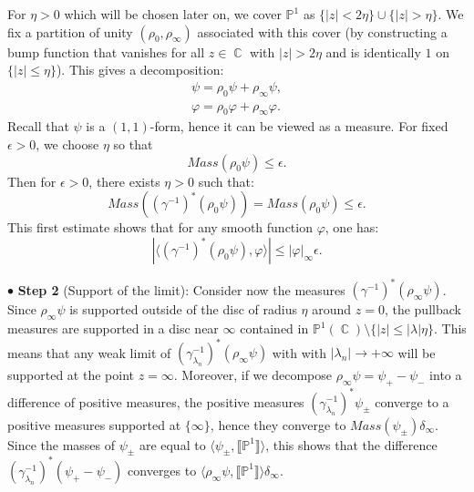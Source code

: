 \documentclass[12pt]{amsbook}%
\theoremstyle{definition}
\theoremstyle{remark}
\numberwithin{section}{chapter}
\numberwithin{subsection}{section}
\numberwithin{figure}{chapter}
\DeclareMathOperator{\C}{\mathbb{C}}
\newcommand\intcur[1]{\llbracket #1 \rrbracket}
\def\bP{{\mathbb{P}}}
\def\la{\lambda}
\begin{document}
{{For $\eta>0$ which will be chosen later on,
we cover $\bP^1$ as $\{ |z| < 2 \eta \} \cup \{ |z| > \eta \}$. We fix a partition of unity $(\rho_0, \rho_\infty)$ associated with this 
cover (by constructing a bump function that vanishes for all $z\in \C$ with $|z|> 2\eta$ and is identically $1$ on $\{ |z| \leqslant \eta\}$). 
This gives a decomposition:
\begin{align*}
\psi = \rho_0 \psi + \rho_\infty \psi, \\
\varphi = \rho_0 \varphi + \rho_\infty \varphi. 
\end{align*}
Recall that $\psi$ is a $(1,1)$-form, hence it can be viewed as a measure. 
For fixed $\epsilon>0$, we choose $\eta$ so that
\begin{equation*} 
Mass(\rho_0 \psi) \leqslant \epsilon.
\end{equation*}
Then for $\epsilon>0$, there exists $\eta >0$ such that:
\begin{equation} \label{eq_small_mass}
Mass((\gamma^{-1})^* (\rho_0\psi)) = Mass(\rho_0\psi) \leqslant \epsilon.
\end{equation}
This first estimate shows that for any smooth function $\varphi$, one has:
\begin{equation} \label{eq_mass_1}
\left | \langle (\gamma^{-1})^* (\rho_0\psi), \varphi \rangle \right | \leqslant |\varphi|_\infty \epsilon. 
\end{equation}

$\bullet$ \textbf{Step 2} (Support of the limit): Consider now the measures $(\gamma^{-1})^* (\rho_\infty \psi) $. Since $\rho_\infty \psi$ is supported outside of the disc of radius $\eta$ around $z=0$, the pullback measures are supported in a disc near $\infty$ contained in $\bP^1(\C) \setminus \{ |z| \leqslant |\lambda| \eta  \}$. 
 This means that any weak limit of $(\gamma_{\la_n}^{-1})^* (\rho_\infty \psi)$ with with $|\lambda_n| \rightarrow +\infty$  will 
  be supported at the point $z = \infty$. 
Moreover, if we decompose $\rho_\infty \psi = \psi_+ - \psi_-$ into a difference of positive measures, the positive measures $(\gamma_{\la_n}^{-1})^* \psi_{\pm}$ converge to a positive measures supported at $\{\infty\}$, hence they converge to 
$ Mass(\psi_\pm) \delta_{\infty} $.  
Since the masses of $\psi_\pm$ are equal to $ \langle \psi_\pm , \intcur{\bP^1} \rangle $, this shows that the difference $(\gamma_{\la_n}^{-1})^*(\psi_+ - \psi_-)$  converges to  $ \langle  \rho_\infty \psi , \intcur{\bP^1}\rangle \delta_\infty  $.   

\smallskip 

}}
\end{document}
